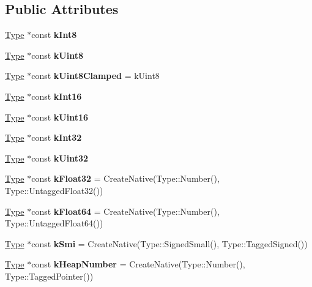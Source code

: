 \subsection*{Public Attributes}
\begin{DoxyCompactItemize}
\item 
\hyperlink{classv8_1_1internal_1_1_type}{Type} $\ast$const {\bfseries k\+Int8}
\item 
\hyperlink{classv8_1_1internal_1_1_type}{Type} $\ast$const {\bfseries k\+Uint8}
\item 
\hyperlink{classv8_1_1internal_1_1_type}{Type} $\ast$const {\bfseries k\+Uint8\+Clamped} = k\+Uint8\hypertarget{classv8_1_1internal_1_1_type_cache_a6fb677b1514f6d717b5459756b5fb2f4}{}\label{classv8_1_1internal_1_1_type_cache_a6fb677b1514f6d717b5459756b5fb2f4}

\item 
\hyperlink{classv8_1_1internal_1_1_type}{Type} $\ast$const {\bfseries k\+Int16}
\item 
\hyperlink{classv8_1_1internal_1_1_type}{Type} $\ast$const {\bfseries k\+Uint16}
\item 
\hyperlink{classv8_1_1internal_1_1_type}{Type} $\ast$const {\bfseries k\+Int32}
\item 
\hyperlink{classv8_1_1internal_1_1_type}{Type} $\ast$const {\bfseries k\+Uint32}
\item 
\hyperlink{classv8_1_1internal_1_1_type}{Type} $\ast$const {\bfseries k\+Float32} = Create\+Native(Type\+::\+Number(), Type\+::\+Untagged\+Float32())\hypertarget{classv8_1_1internal_1_1_type_cache_a770aee08efcc56ea5a04a13660488705}{}\label{classv8_1_1internal_1_1_type_cache_a770aee08efcc56ea5a04a13660488705}

\item 
\hyperlink{classv8_1_1internal_1_1_type}{Type} $\ast$const {\bfseries k\+Float64} = Create\+Native(Type\+::\+Number(), Type\+::\+Untagged\+Float64())\hypertarget{classv8_1_1internal_1_1_type_cache_afe3bd5044c22514d6c3fc1c620997f5c}{}\label{classv8_1_1internal_1_1_type_cache_afe3bd5044c22514d6c3fc1c620997f5c}

\item 
\hyperlink{classv8_1_1internal_1_1_type}{Type} $\ast$const {\bfseries k\+Smi} = Create\+Native(Type\+::\+Signed\+Small(), Type\+::\+Tagged\+Signed())\hypertarget{classv8_1_1internal_1_1_type_cache_ac4cae5594651c7fede9664eca42af7bc}{}\label{classv8_1_1internal_1_1_type_cache_ac4cae5594651c7fede9664eca42af7bc}

\item 
\hyperlink{classv8_1_1internal_1_1_type}{Type} $\ast$const {\bfseries k\+Heap\+Number} = Create\+Native(Type\+::\+Number(), Type\+::\+Tagged\+Pointer())\hypertarget{classv8_1_1internal_1_1_type_cache_ad7a37bce97980e771cb23ceb20a0209b}{}\label{classv8_1_1internal_1_1_type_cache_ad7a37bce97980e771cb23ceb20a0209b}


\end{DoxyCompactItemize}
